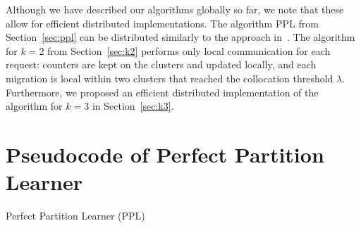 \documentclass[a4paper,anonymous,USenglish]{lipics-v2019}
\newcommand{\PPL}{\textsc{PPL}\xspace}
\DeclarePairedDelimiter\set{\{}{\}}
\begin{document}
Although we have described our algorithms globally so far, we note that these allow for efficient distributed implementations. 
The algorithm PPL from Section~\ref{sec:ppl} can be distributed
similarly to the approach in~\cite{sigmetrics19_partitioning}.
The algorithm for $k=2$ from Section~\ref{sec:k2} performs only local communication for each request: counters are kept on the clusters and updated locally, and each migration is local within two clusters that reached the collocation threshold $\lambda$.
Furthermore, we proposed an efficient distributed implementation of the algorithm for $k=3$ in Section~\ref{sec:k3}.




\appendix

\section{Pseudocode of Perfect Partition Learner}

\begin{algorithm}
	\renewcommand{\algorithmicrequire}{\textbf{Input:}}
	\renewcommand{\algorithmicensure}{\textbf{Output:}}
	\begin{algorithmic}
		\label{line:initcomponents}
		 \label{line:mergecomponents}
		\label{line:rebalance} 
		\ENDIF
		\ENDIF
		\ENDFOR
	\end{algorithmic}
	\caption{Perfect Partition Learner (\PPL)}
	\label{alg:ppl}
\end{algorithm}
\end{document}
